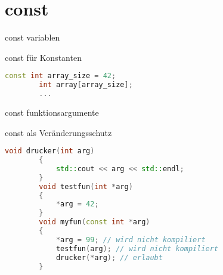\section{const}
\begin{frame}[fragile]{const variablen}

\begin{block}{const für Konstanten}
	\begin{lstlisting}[language=C++]
		const int array_size = 42;
		int array[array_size];
		...
	\end{lstlisting}
\end{block}

\end{frame}
\begin{frame}[fragile]{const funktionsargumente}

\begin{block}{const als Veränderungsschutz}
	\begin{lstlisting}[language=C++]
		void drucker(int arg)
		{
			std::cout << arg << std::endl;
		}
		void testfun(int *arg)
		{
			*arg = 42;
		}
		void myfun(const int *arg)
		{
			*arg = 99; // wird nicht kompiliert
			testfun(arg); // wird nicht kompiliert
			drucker(*arg); // erlaubt
		}
	\end{lstlisting}
\end{block}

\end{frame}
